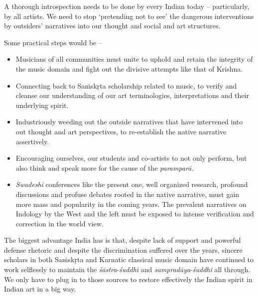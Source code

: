 A thorough introspection needs to be done by every Indian today – particularly, by all artists. We need to stop ‘pretending not to see’ the dangerous interventions by outsiders’ narratives into our thought and social and art structures.

Some practical steps would be –

\begin{itemize}
\itemsep=0pt

 \item Musicians of all communities must unite to uphold and retain the integrity of the music domain and fight out the divisive attempts like that of Krishna.

 \item Connecting back to Saṁskṛta scholarship related to music, to verify and cleanse our understanding of our art terminologies, interpretations and their underlying spirit.

 \item Industriously weeding out the outside narratives that have intervened into out thought and art perspectives, to re-establish the native narrative assertively.

 \item Encouraging ourselves, our students and co-artists to not only perform, but also think and speak more for the cause of the \textit{paramparā.}

 \item \textit{Swadeshi} conferences like the present one, well organized research, profound discussions and profuse debates rooted in the native narrative, must gain more mass and popularity in the coming years. The prevalent narratives on Indology by the West and the left must be exposed to intense verification and correction in the world view.

\end{itemize}

The biggest advantage India has is that, despite lack of support and powerful defense rhetoric and despite the discrimination suffered over the years, sincere scholars in both Saṁskṛta and Karnatic classical music domain have continued to work selflessly to maintain the \textit{śāstra}-\textit{śuddhi} and \textit{sampradāya}-\textit{śuddhi} all through. We only have to plug in to those sources to restore effectively the Indian spirit in Indian art in a big way.

\newpage


